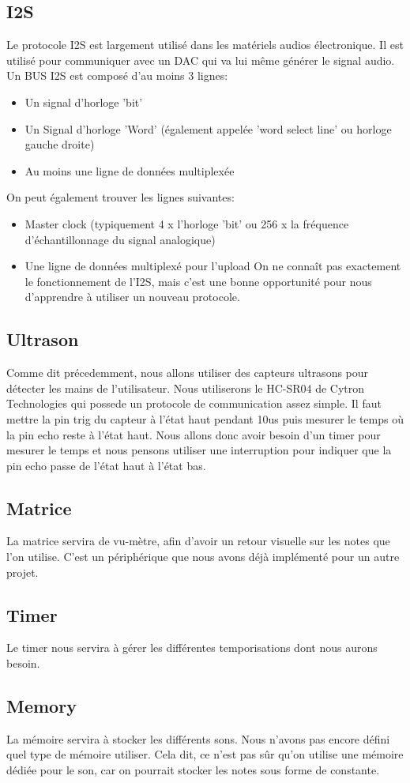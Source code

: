 \documentclass{article}
\begin{document}
\subsection{I2S}
Le protocole I2S est largement utilisé dans les matériels audios électronique. Il est utilisé pour communiquer avec un DAC qui va lui même générer le signal audio. Un BUS I2S est composé d'au moins 3 lignes:
\begin{itemize}
    \item Un signal d'horloge 'bit'
    \item Un Signal d'horloge 'Word' (également appelée 'word select line' ou horloge gauche droite)
    \item Au moins une ligne de données multiplexée
\end{itemize}
On peut également trouver les lignes suivantes:
\begin{itemize}
    \item Master clock (typiquement 4 x l'horloge 'bit' ou 256 x la fréquence d'échantillonnage du signal analogique)
    \item Une ligne de données multiplexé pour l'upload
On ne connaît pas exactement le fonctionnement de l'I2S, mais c'est une bonne opportunité pour nous d'apprendre à utiliser un nouveau protocole. 
\end{itemize}
\subsection{Ultrason}
Comme dit précedemment, nous allons utiliser des capteurs ultrasons pour détecter les mains de l'utilisateur. Nous utiliserons le HC-SR04 de Cytron Technologies qui possede un protocole de communication assez simple. Il faut mettre la pin trig du capteur à l'état haut pendant 10us puis mesurer le temps où la pin echo reste à l'état haut. Nous allons donc avoir besoin d'un timer pour mesurer le temps et nous pensons utiliser une interruption pour indiquer que la pin echo passe de l'état haut à l'état bas.

\subsection{Matrice}
La matrice servira de vu-mètre, afin d'avoir un retour visuelle sur les notes que l'on utilise. C'est un périphérique que nous avons déjà implémenté pour un autre projet. 
\subsection{Timer}
Le timer nous servira à gérer les différentes temporisations dont nous aurons besoin.
\subsection{Memory}
La mémoire servira à stocker les différents sons. Nous n'avons pas encore défini quel type de mémoire utiliser. Cela dit, ce n'est pas sûr qu'on utilise une mémoire dédiée pour le son, car on pourrait stocker les notes sous forme de constante. 
\end{document}
